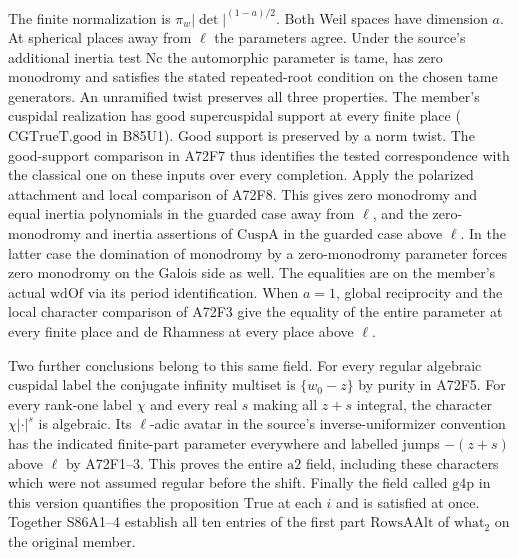 The finite normalization is $\pi_w|\det|^{(1-a)/2}$. Both
Weil spaces have dimension $a$. At spherical places away from
$\ell$ the parameters agree. Under the source's additional inertia
test $\mathrm{Nc}$ the automorphic parameter is tame, has zero
monodromy and satisfies the stated repeated-root condition on the
chosen tame generators. An unramified twist preserves all three
properties. The member's cuspidal realization has good supercuspidal support
at every finite place (\(\mathrm{CGTrueT.good}\) in B85U1). Good
support is preserved by a norm twist. The good-support comparison
in A72F7 thus identifies the tested correspondence with the
classical one on these inputs over every completion. Apply the
polarized attachment and local comparison of A72F8. This gives
zero monodromy and equal inertia polynomials in the guarded case
away from $\ell$, and the zero-monodromy and inertia assertions of
$\mathrm{CuspA}$ in the guarded case above $\ell$. In the latter
case the domination of monodromy by a zero-monodromy parameter
forces zero monodromy on the Galois side as well. The equalities
are on the member's actual $\mathrm{wdOf}$ via its period
identification. When $a=1$, global reciprocity and the local character
comparison of A72F3 give the equality of the entire parameter at
every finite place and de Rhamness at every place above $\ell$.

Two further conclusions belong to this same field. For every regular
algebraic cuspidal label the conjugate infinity multiset is
$\{w_0-z\}$ by purity in A72F5. For every rank-one label $\chi$
and every real $s$ making all $z+s$ integral, the character
$\chi|\cdot|^s$ is algebraic. Its $\ell$-adic avatar in the source's
inverse-uniformizer convention has the indicated finite-part
parameter everywhere and labelled jumps $-(z+s)$ above $\ell$
by A72F1--3. This proves the entire $\mathrm{a2}$ field, including
these characters which were not assumed regular before the shift.
Finally the field called $\mathrm{g4p}$ in this version quantifies
the proposition $\mathrm{True}$ at each $i$ and is satisfied at once.
Together S86A1--4 establish all ten entries of the first part
$\mathrm{RowsAAlt}$ of $\mathrm{what}_2$ on the original member.
